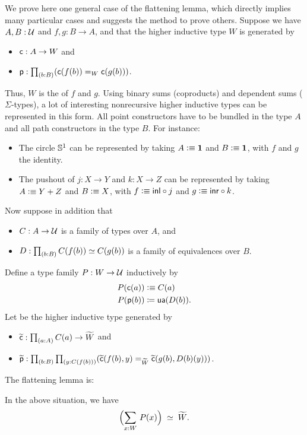 We prove here one general case of the flattening lemma, which directly implies many particular cases and suggests the method to prove others.
Suppose we have $A,B:\mathcal{U}$ and $f,g:B\to{}A$, and that the higher inductive type $W$ is generated by
\begin{itemize}
\item $\mathsf{c}:A\to{}W$ and
\item $\pp:\prd{b:B} (\cc(f(b))=_W\cc(g(b)))$.
\end{itemize}
Thus, $W$ is the 
%
%
of $f$ and $g$.
Using binary sums (coproducts) and dependent sums ($\Sigma$-types), a lot of interesting nonrecursive higher
inductive types can be represented in this form. All point constructors have to
be bundled in the type $A$ and all path constructors in the type $B$.
For instance:
\begin{itemize}
\item The circle $\mathbb{S}^1$ can be represented by taking $A\vcentcolon\equiv \mathbf{1}$ and $B\vcentcolon\equiv \mathbf{1}$, with $f$ and $g$ the identity.
\item The pushout of $j:X\to Y$ and $k:X\to Z$ can be represented by taking $A\vcentcolon\equiv Y+Z$ and $B\vcentcolon\equiv X$, with $f\vcentcolon\equiv {\mathsf{inl}} \circ j$ and $g\vcentcolon\equiv {\mathsf{inr}}\circ k$.
\end{itemize}
Now suppose in addition that
\begin{itemize}
\item $C:A\to\mathcal{U}$ is a family of types over $A$, and
\item $D:\prd{b:B}\eqv{C(f(b))}{C(g(b))}$ is a family of equivalences over $B$.
\end{itemize}
Define a type family $P : W\to\mathcal{U}$ inductively by
\begin{align*}
  P(\mathsf{c}(a)) &\vcentcolon\equiv C(a)\\
  {P}\mathopen{}\left({\mathsf{p}(b)}\right)\mathclose{} &\coloneqq \mathsf{ua}(D(b)).
\end{align*}
Let \Wtil be the higher inductive type generated by
\begin{itemize}
\item $\cct:\prd{a:A} C(a) \to \Wtil$ and
\item $\ppt:\prd{b:B}{y:C(f(b))} (\cct(f(b),y)=_{\Wtil}\cct(g(b),D(b)(y)))$.
\end{itemize}

The flattening lemma is:

\begin{lem}\label{thm:flattening}
  In the above situation, we have
  \[ \eqvspaced{\Parens{\sm{x:W} P(x)}}{\widetilde{W}}. \]
\end{lem}


